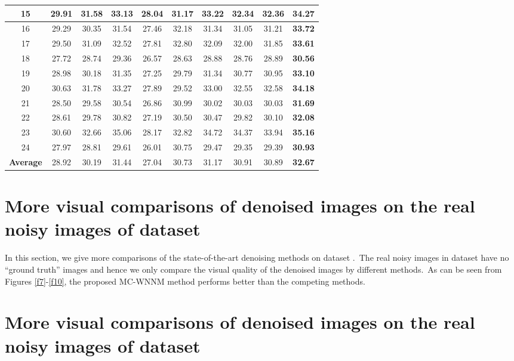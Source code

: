 \documentclass[10pt,onecolumn,letterpaper]{article}
\begin{document}
\begin{table}[!htbp]
\begin{center}
\begin{tabular}{|c||c|c|c|c|c|c|c|c|c|}
\hline
15 & 29.91 & 31.58 & 33.13 & 28.04 & 31.17 & 33.22 & 32.34 & 32.36 & \textbf{34.27}
\\
\hline
16 & 29.29 & 30.35 & 31.54 & 27.46 & 32.18 & 31.34 & 31.05 & 31.21 & \textbf{33.72}
\\
\hline
17 & 29.50 & 31.09 & 32.52 & 27.81 & 32.80 & 32.09 & 32.00 & 31.85 & \textbf{33.61}
\\
\hline
18 & 27.72 & 28.74 & 29.36 & 26.57 & 28.63 & 28.88 & 28.76 & 28.89 & \textbf{30.56}
\\
\hline
19 & 28.98 & 30.18 & 31.35 & 27.25 & 29.79 & 31.34 & 30.77 & 30.95 & \textbf{33.10}
\\
\hline
20 & 30.63 & 31.78 & 33.27 & 27.89 & 29.52 & 33.00 & 32.55 & 32.58 & \textbf{34.18}
\\
\hline
21 & 28.50 & 29.58 & 30.54 & 26.86 & 30.99 & 30.02 & 30.03 & 30.03 & \textbf{31.69}
\\
\hline
22 & 28.61 & 29.78 & 30.82 & 27.19 & 30.50 & 30.47 & 29.82 & 30.10 & \textbf{32.08}
\\
\hline
23 & 30.60 & 32.66 & 35.06 & 28.17 & 32.82 & 34.72 & 34.37 & 33.94 & \textbf{35.16}
\\
\hline
24 & 27.97 & 28.81 & 29.61 & 26.01 & 30.75 & 29.47 & 29.35 & 29.39 & \textbf{30.93}
\\
\hline
\textbf{Average} & 28.92 & 30.19 & 31.44 & 27.04 & 30.73 & 31.17 & 30.91 & 30.89 & \textbf{32.67}
\\
\hline
\end{tabular}
\end{center}
\end{table}

\section{More visual comparisons of denoised images on the real noisy images of dataset \cite{ncwebsite}}

In this section, we give more comparisons of the state-of-the-art denoising methods on dataset \cite{ncwebsite}.\ The real noisy images in dataset \cite{ncwebsite} have no ``ground truth'' images and hence we only compare the visual quality of the denoised images by different methods.\ As can be seen from Figures \ref{f7}-\ref{f10}, the proposed MC-WNNM method performs better than the competing methods.


\section{More visual comparisons of denoised images on the real noisy images of dataset \cite{crosschannel2016}}
\end{document}
